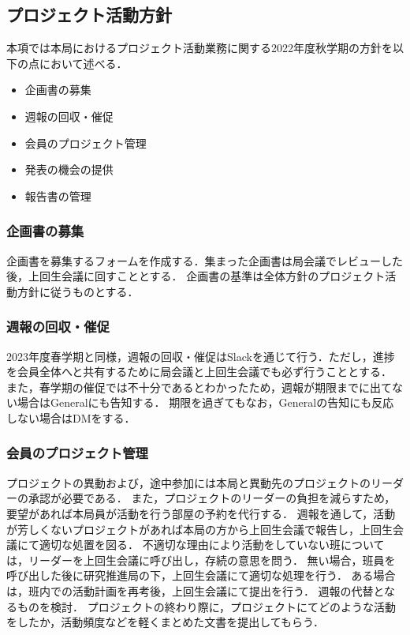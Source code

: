 \subsection*{プロジェクト活動方針}


本項では本局におけるプロジェクト活動業務に関する2022年度秋学期の方針を以下の点において述べる．

\begin{itemize}
  \item 企画書の募集
  \item 週報の回収・催促
  \item 会員のプロジェクト管理
  \item 発表の機会の提供
  \item 報告書の管理
\end{itemize}

\subsubsection*{企画書の募集}

企画書を募集するフォームを作成する．集まった企画書は局会議でレビューした後，上回生会議に回すこととする．
企画書の基準は全体方針のプロジェクト活動方針に従うものとする．

\subsubsection*{週報の回収・催促}

2023年度春学期と同様，週報の回収・催促はSlackを通じて行う．ただし，進捗を会員全体へと共有するために局会議と上回生会議でも必ず行うこととする．
また，春学期の催促では不十分であるとわかったため，週報が期限までに出てない場合はGeneralにも告知する．
期限を過ぎてもなお，Generalの告知にも反応しない場合はDMをする．

\subsubsection*{会員のプロジェクト管理}

プロジェクトの異動および，途中参加には本局と異動先のプロジェクトのリーダーの承認が必要である．
また，プロジェクトのリーダーの負担を減らすため，要望があれば本局員が活動を行う部屋の予約を代行する．
週報を通して，活動が芳しくないプロジェクトがあれば本局の方から上回生会議で報告し，上回生会議にて適切な処置を図る．
不適切な理由により活動をしていない班については，リーダーを上回生会議に呼び出し，存続の意思を問う．
無い場合，班員を呼び出した後に研究推進局の下，上回生会議にて適切な処理を行う．
ある場合は，班内での活動計画を再考後，上回生会議にて提出を行う．
週報の代替となるものを検討．
プロジェクトの終わり際に，プロジェクトにてどのような活動をしたか，活動頻度などを軽くまとめた文書を提出してもらう．

